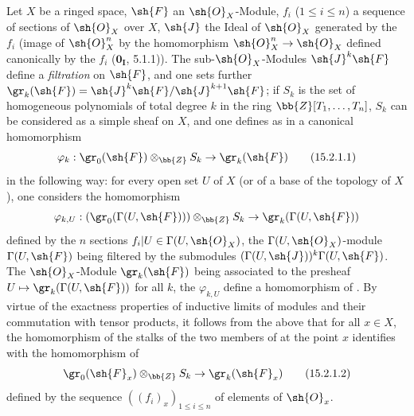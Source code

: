 \begin{env}[15.2.1]
\label{0.15.2.1}
Let $X$ be a ringed space, $\sh{F}$ an $\sh{O}_X$-Module, $f_i$ ($1\leq i\leq n$) a sequence of sections of $\sh{O}_X$ over $X$, $\sh{J}$ the Ideal of $\sh{O}_X$ generated by the $f_i$ (image of $\sh{O}_X^n$ by the homomorphism $\sh{O}_X^n\to\sh{O}_X$ defined canonically by the $f_i$ ($\mathbf{0_I}$, 5.1.1)).
The sub-$\sh{O}_X$-Modules $\sh{J}^k\sh{F}$ define a \emph{filtration} on $\sh{F}$, and one sets further $\gr_k(\sh{F})=\sh{J}^k\sh{F}/\sh{J}^{k+1}\sh{F}$;
if $S_k$ is the set of homogeneous polynomials of total degree $k$ in the ring $\bb{Z}[T_1,\ldots,T_n]$, $S_k$ can be considered as a simple sheaf on $X$, and one defines as in  a canonical homomorphism
\[
\label{0.15.2.1.1}
  \varphi_k : \gr_0(\sh{F})\otimes_{\bb{Z}} S_k \to \gr_k(\sh{F})
\tag{15.2.1.1}
\]
in the following way:
for every open set $U$ of $X$ (or of a base of the topology of $X$), one considers the homomorphism 
\[
  \varphi_{k,U} : (\gr_0(\Gamma(U,\sh{F})))\otimes_{\bb{Z}}S_k \to \gr_k(\Gamma(U,\sh{F}))
\]
defined by the $n$ sections $f_i|U\in\Gamma(U,\sh{O}_X)$, the $\Gamma(U,\sh{O}_X)$-module $\Gamma(U,\sh{F})$ being filtered by the submodules $(\Gamma(U,\sh{J}))^k\Gamma(U,\sh{F})$.
The $\sh{O}_X$-Module $\gr_k(\sh{F})$ being associated to the presheaf $U\mapsto\gr_k(\Gamma(U,\sh{F}))$ for all $k$, the $\varphi_{k,U}$ define a homomorphism of .
By virtue of the exactness properties of inductive limits of modules and their commutation with tensor products, it follows from the above that for all $x\in X$, the homomorphism of the stalks of the two members of  at the point $x$ identifies with the homomorphism of 
\[
\label{0.15.2.1.2}
  \gr_0(\sh{F}_x)\otimes_{\bb{Z}}S_k \to \gr_k(\sh{F}_x)
\tag{15.2.1.2}
\]
defined by the sequence $((f_i)_x)_{1\leq i\leq n}$ of elements of $\sh{O}_x$.
\end{env}

